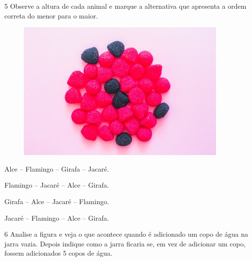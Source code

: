 \num{5} Observe a altura de cada animal e marque a alternativa que apresenta a
ordem correta do menor para o maior.

\begin{figure}[htpb!]
\includegraphics[width=\textwidth]{./media/image139.png}
\end{figure}

\begin{minipage}{.5\textwidth}
\begin{escolha}
\item Alce -- Flamingo -- Girafa -- Jacaré.

\item Flamingo -- Jacaré -- Alce -- Girafa.

\item Girafa -- Alce -- Jacaré -- Flamingo.

\item Jacaré -- Flamingo -- Alce -- Girafa.
\end{escolha}
\end{minipage}

\num{6} Analise a figura e veja o que acontece quando é adicionado um copo de
água na jarra vazia. Depois indique como a jarra ficaria se, em vez de
adicionar um copo, fossem adicionados 5 copos de água.

